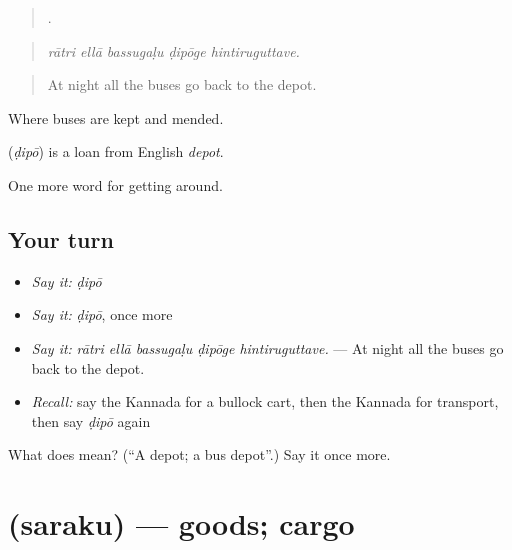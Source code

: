 \begin{quote}
    .
\end{quote}

\begin{quote}
\emph{rātri ellā bassugaḷu ḍipōge hintiruguttave.}
\end{quote}

\begin{quote}
At night all the buses go back to the depot.
\end{quote}

Where buses are kept and mended.

\begin{cousinweb}
\textbf{} (\emph{ḍipō}) is a loan from English \emph{depot}.
\end{cousinweb}

\begin{grammarlens}[title={What you've built}]
One more word for getting around.
\end{grammarlens}

\subsection*{Your turn}
\begin{itemize}
\raggedright
  \item \emph{Say it:} \emph{ḍipō}
  \item \emph{Say it:} \emph{ḍipō}, once more
  \item \emph{Say it:} \emph{rātri ellā bassugaḷu ḍipōge hintiruguttave.} — At night all the buses go back to the depot.
  \item \emph{Recall:} say the Kannada for a bullock cart, then the Kannada for transport, then say \emph{ḍipō} again
\end{itemize}

\begin{tcolorbox}[breakable,colback=teal!4,colframe=teal!35!black,title={Before you move on}]
What does  mean? (\textquotedblleft{}A depot; a bus depot\textquotedblright{}.) Say it once more.
\end{tcolorbox}
\section[\texorpdfstring{\kn{ಸರಕು} (saraku)}{ಸರಕು (saraku)}]{ (saraku) — goods; cargo}

\label{lesson:KA-C452-saraku}



